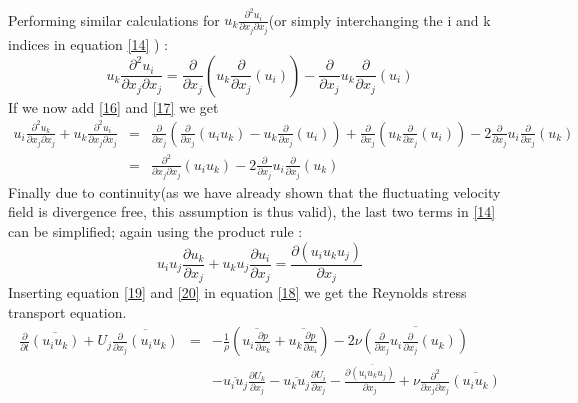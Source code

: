\documentclass[11pt]{article}
\begin{document}
{\begin{eqnarray}
\end{eqnarray}
Performing similar calculations for $u_{k}\frac{\partial^{2}u_{i}}{\partial x_{j}\partial x_{j}}$(or
simply interchanging the i and k indices in equation \eqref{14} ) :
\begin{equation}
\label{18}
u_{k}\frac{\partial^{2}u_{i}}{\partial x_{j}\partial x_{j}}=\frac{\partial}{\partial x_{j}}\left(u_{k}\frac{\partial}{\partial x_{j}}(u_{i})\right)-\frac{\partial}{\partial x_{j}}u_{k}\frac{\partial}{\partial x_{j}}(u_{i})
\end{equation}
If we now add \eqref{16} and \eqref{17} we get 
\begin{eqnarray} \nonumber
u_{i}\frac{\partial^{2}u_{k}}{\partial x_{j}\partial x_{j}}+u_{k}\frac{\partial^{2}u_{i}}{\partial x_{j}\partial x_{j}} & = 
& \frac{\partial}{\partial x_{j}}\left(\frac{\partial}{\partial x_{j}}(u_{i}u_{k})
-u_{k}\frac{\partial}{\partial x_{j}}(u_{i})\right)+\frac{\partial}{\partial x_{j}}\left(u_{k}\frac{\partial}{\partial x_{j}}(u_{i})\right)
-2\frac{\partial}{\partial x_{j}}u_{i}\frac{\partial}{\partial x_{j}}(u_{k})\\ \label{19}
 & = & \frac{\partial^{2}}{\partial x_{j}\partial x_{j}}(u_{i}u_{k})
-2\frac{\partial}{\partial x_{j}}u_{i}\frac{\partial}{\partial x_{j}}(u_{k})
\end{eqnarray}
Finally due to continuity(as we have already shown that the fluctuating
velocity field is divergence free, this assumption is thus valid), the
last two terms in \eqref{14} can be simplified; again using the product rule :
\begin{equation}
\label{20}
u_{i}u_{j}\frac{\partial u_{k}}{\partial x_{j}}+u_{k}u_{j}\frac{\partial u_{i}}{\partial x_{j}}=\frac{\partial(u_{i}u_{k}u_{j})}{\partial x_{j}}
\end{equation}
Inserting equation \eqref{19} and \eqref{20} in equation \eqref{18} we get the Reynolds stress transport equation. 
\begin{eqnarray}
\label{21}
\frac{\partial}{\partial t}\overline{(u_{i}u_{k})}+U_{j}\overline{\frac{\partial}{\partial x_{j}}(u_{i}u_{k})} & = 
& -\frac{1}{\rho}\left(\overline{u_{i}\frac{\partial p}{\partial x_{k}}}+\overline{u_{k}\frac{\partial p}{\partial x_{i}}}\right)
-2\nu\overline{\left(\frac{\partial}{\partial x_{j}}u_{i}\frac{\partial}{\partial x_{j}}(u_{k})\right)}\\
 &  & -\overline{u_{i}u_{j}}\frac{\partial U_{k}}{\partial x_{j}}-\overline{u_{k}u_{j}}\frac{\partial U_{i}}{\partial x_{j}}
-\frac{\partial\overline{(u_{i}u_{k}u_{j})}}{\partial x_{j}}+\nu\frac{\partial^{2}}{\partial x_{j}\partial x_{j}}\overline{(u_{i}u_{k})}\nonumber 
\end{eqnarray}


}
\end{document}
